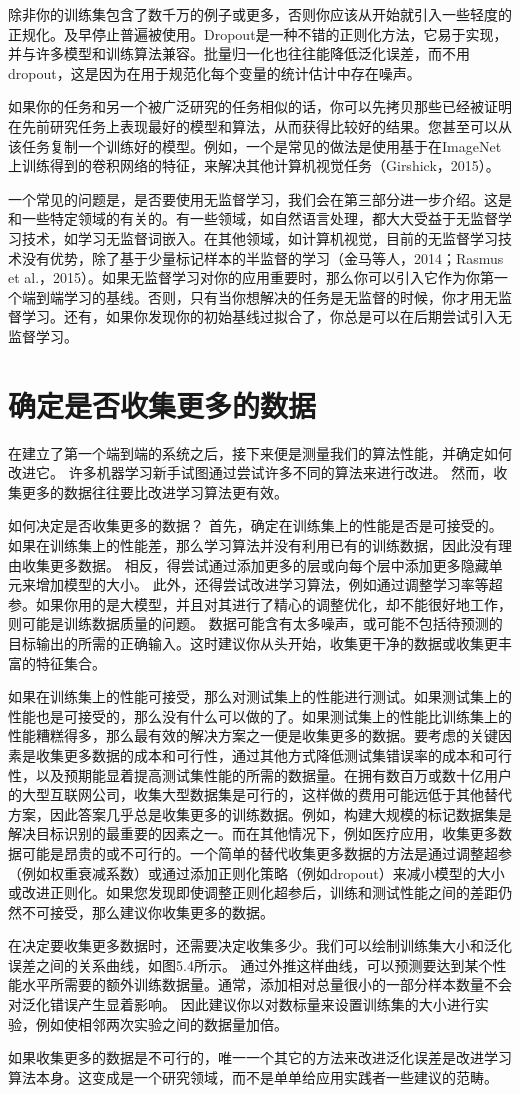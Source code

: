 除非你的训练集包含了数千万的例子或更多，否则你应该从开始就引入一些轻度的正规化。及早停止普遍被使用。Dropout是一种不错的正则化方法，它易于实现，并与许多模型和训练算法兼容。批量归一化也往往能降低泛化误差，而不用dropout，这是因为在用于规范化每个变量的统计估计中存在噪声。 

如果你的任务和另一个被广泛研究的任务相似的话，你可以先拷贝那些已经被证明在先前研究任务上表现最好的模型和算法，从而获得比较好的结果。您甚至可以从该任务复制一个训练好的模型。例如，一个是常见的做法是使用基于在ImageNet上训练得到的卷积网络的特征，来解决其他计算机视觉任务（Girshick，2015）。

一个常见的问题是，是否要使用无监督学习，我们会在第三部分进一步介绍。这是和一些特定领域的有关的。有一些领域，如自然语言处理，都大大受益于无监督学习技术，如学习无监督词嵌入。在其他领域，如计算机视觉，目前的无监督学习技术没有优势，除了基于少量标记样本的半监督的学习（金马等人，2014；Rasmus et al.，2015）。如果无监督学习对你的应用重要时，那么你可以引入它作为你第一个端到端学习的基线。否则，只有当你想解决的任务是无监督的时候，你才用无监督学习。还有，如果你发现你的初始基线过拟合了，你总是可以在后期尝试引入无监督学习。


\section{确定是否收集更多的数据}

在建立了第一个端到端的系统之后，接下来便是测量我们的算法性能，并确定如何改进它。 许多机器学习新手试图通过尝试许多不同的算法来进行改进。 然而，收集更多的数据往往要比改进学习算法更有效。

如何决定是否收集更多的数据？ 首先，确定在训练集上的性能是否是可接受的。 如果在训练集上的性能差，那么学习算法并没有利用已有的训练数据，因此没有理由收集更多数据。 相反，得尝试通过添加更多的层或向每个层中添加更多隐藏单元来增加模型的大小。 此外，还得尝试改进学习算法，例如通过调整学习率等超参。如果你用的是大模型，并且对其进行了精心的调整优化，却不能很好地工作，则可能是训练数据质量的问题。 数据可能含有太多噪声，或可能不包括待预测的目标输出的所需的正确输入。这时建议你从头开始，收集更干净的数据或收集更丰富的特征集合。

如果在训练集上的性能可接受，那么对测试集上的性能进行测试。如果测试集上的性能也是可接受的，那么没有什么可以做的了。如果测试集上的性能比训练集上的性能糟糕得多，那么最有效的解决方案之一便是收集更多的数据。要考虑的关键因素是收集更多数据的成本和可行性，通过其他方式降低测试集错误率的成本和可行性，以及预期能显着提高测试集性能的所需的数据量。在拥有数百万或数十亿用户的大型互联网公司，收集大型数据集是可行的，这样做的费用可能远低于其他替代方案，因此答案几乎总是收集更多的训练数据。例如，构建大规模的标记数据集是解决目标识别的最重要的因素之一。而在其他情况下，例如医疗应用，收集更多数据可能是昂贵的或不可行的。一个简单的替代收集更多数据的方法是通过调整超参（例如权重衰减系数）或通过添加正则化策略（例如dropout）来减小模型的大小或改进正则化。如果您发现即使调整正则化超参后，训练和测试性能之间的差距仍然不可接受，那么建议你收集更多的数据。

在决定要收集更多数据时，还需要决定收集多少。我们可以绘制训练集大小和泛化误差之间的关系曲线，如图5.4所示。 通过外推这样曲线，可以预测要达到某个性能水平所需要的额外训练数据量。通常，添加相对总量很小的一部分样本数量不会对泛化错误产生显着影响。 因此建议你以对数标量来设置训练集的大小进行实验，例如使相邻两次实验之间的数据量加倍。

如果收集更多的数据是不可行的，唯一一个其它的方法来改进泛化误差是改进学习算法本身。这变成是一个研究领域，而不是单单给应用实践者一些建议的范畴。


